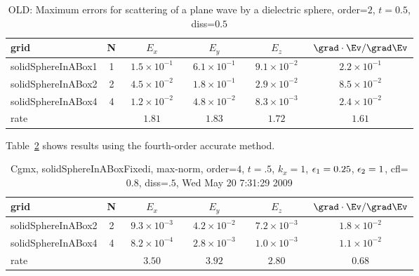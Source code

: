 \begin{table}[hbt]
\begin{center}
\begin{tabular}{|l|c|c|c|c|c|} \hline\hline 
grid  & N &  $E_x$ &  $E_y$ & $E_z$ & $\grad\cdot\Ev/\grad\Ev$\\ \hline 
  solidSphereInABox1 &     1 & ~$1.5\times10^{ -1}$~ & ~$6.1\times10^{ -1}$~ & ~$9.1\times10^{ -2}$~ & ~$2.2\times10^{ -1}$~  \\ \hline
  solidSphereInABox2 &     2 & ~$4.5\times10^{ -2}$~ & ~$1.8\times10^{ -1}$~ & ~$2.9\times10^{ -2}$~ & ~$8.5\times10^{ -2}$~  \\ \hline
  solidSphereInABox4 &     4 & ~$1.2\times10^{ -2}$~ & ~$4.8\times10^{ -2}$~ & ~$8.3\times10^{ -3}$~ & ~$2.4\times10^{ -2}$~  \\ \hline
    rate             &       &       $1.81$          &       $1.83$          &       $1.72$          &       $1.61$           \\ \hline\hline
\end{tabular}
\caption{OLD: Maximum errors for scattering of a plane wave by a dielectric sphere, order=$2$, $t=0.5$, diss=$0.5$}\label{table:dielectricSphere}
\end{center}
\end{table}

Table~\ref{table:dielectricSphereOrder4} shows results using the fourth-order accurate method.

\begin{table}[hbt]\tableFont %
\begin{center}
\begin{tabular}{|l|c|c|c|c|c|} \hline 
grid  & N &  $E_x$ &  $E_y$ & $E_z$ & $\grad\cdot\Ev/\grad\Ev$\\ \hline 
  solidSphereInABox2 &     2 & ~$9.3\times10^{ -3}$~ & ~$4.2\times10^{ -2}$~ & ~$7.2\times10^{ -3}$~ & ~$1.8\times10^{ -2}$~  \\ \hline
  solidSphereInABox4 &     4 & ~$8.2\times10^{ -4}$~ & ~$2.8\times10^{ -3}$~ & ~$1.0\times10^{ -3}$~ & ~$1.1\times10^{ -2}$~  \\ \hline
    rate             &       &       $3.50$          &       $3.92$          &       $2.80$          &       $0.68$           \\ \hline
\end{tabular}
\caption{Cgmx, solidSphereInABoxFixedi, max-norm, order=$4$, $t=.5$, $k_x=1$, $\epsilon_1=0.25$, $\epsilon_2=1$, cfl=$0.8$, diss=$.5$, Wed May 20  7:31:29 2009}\label{table:dielectricSphereOrder4}
\end{center}
\end{table}

